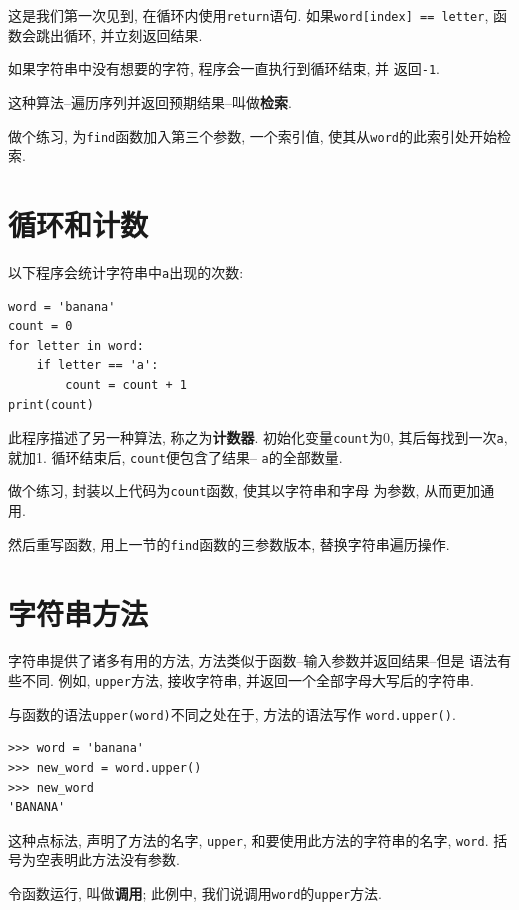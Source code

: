 \documentclass[10pt]{book}
\begin{document}
这是我们第一次见到, 在循环内使用{\tt return}语句. 
如果{\tt word[index] == letter}, 函数会跳出循环, 并立刻返回结果. 

如果字符串中没有想要的字符, 程序会一直执行到循环结束, 并
返回{\tt -1}.

这种算法--遍历序列并返回预期结果--叫做{\bf 检索}. 

做个练习, 为{\tt find}函数加入第三个参数, 一个索引值, 
使其从{\tt word}的此索引处开始检索.


\section{循环和计数}
\label{counter}
以下程序会统计字符串中{\tt a}出现的次数:

\begin{verbatim}
word = 'banana'
count = 0
for letter in word:
    if letter == 'a':
        count = count + 1
print(count)
\end{verbatim}
%
此程序描述了另一种算法, 称之为{\bf 计数器}.
初始化变量{\tt count}为0, 其后每找到一次{\tt a}, 就加1.
循环结束后,  {\tt count}便包含了结果-- {\tt a}的全部数量.

做个练习, 封装以上代码为{\tt count}函数, 使其以字符串和字母
为参数, 从而更加通用. 

然后重写函数, 用上一节的{\tt find}函数的三参数版本, 替换字符串遍历操作. 


\section{字符串方法}
\label{optional}
字符串提供了诸多有用的方法, 方法类似于函数--输入参数并返回结果--但是
语法有些不同. 
例如, {\tt upper}方法, 接收字符串, 
并返回一个全部字母大写后的字符串. 

与函数的语法{\tt upper(word)}不同之处在于, 
方法的语法写作 {\tt word.upper()}.

\begin{verbatim}
>>> word = 'banana'
>>> new_word = word.upper()
>>> new_word
'BANANA'
\end{verbatim}
%
这种点标法, 声明了方法的名字, {\tt upper}, 
和要使用此方法的字符串的名字, {\tt word}. 
括号为空表明此方法没有参数. 

令函数运行, 叫做{\bf 调用};
此例中, 我们说调用{\tt word}的{\tt upper}方法. 
\end{document}
